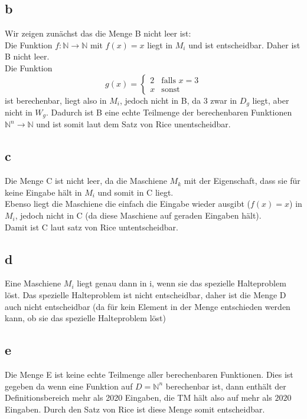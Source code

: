 \documentclass[14pt]{article}
\begin{document}
\subsection*{b}
Wir zeigen zunächst das die Menge B nicht leer ist: \\
Die Funktion $f: \mathbb{N} \rightarrow \mathbb{N}$ mit $f(x) = x$ liegt
in $M_i$ und ist entscheidbar. Daher ist B nicht leer. \\
Die Funktion 
\begin{equation*}
    g(x) =
    \begin{cases}
        2                 & \text{falls $x = 3$}             \\
        x                   & \text{sonst}
    \end{cases}
\end{equation*}
ist berechenbar, liegt also in $M_i$, jedoch nicht in B, da $3$ zwar 
in $D_g$ liegt, aber nicht in $W_g$. Dadurch
ist B eine echte Teilmenge der berechenbaren Funktionen $\mathbb{N}^n
\rightarrow \mathbb{N}$ und ist somit laut dem Satz von Rice
unentscheidbar.
\subsection*{c}
Die Menge C ist nicht leer, da die Maschiene $M_k$ mit der Eigenschaft,
dass sie für keine Eingabe hält in $M_i$ und somit in C liegt. \\
Ebenso liegt die Maschiene die einfach die Eingabe wieder ausgibt
($f(x) = x$) in $M_i$, jedoch nicht in C (da diese Maschiene auf
geraden Eingaben hält). \\
Damit ist C laut satz von Rice untentscheidbar.
\subsection*{d}
Eine Maschiene $M_i$ liegt genau dann in i, wenn sie das spezielle
Halteproblem löst. Das spezielle Halteproblem ist nicht entscheidbar,
daher ist die Menge D auch nicht entscheidbar (da für kein Element
in der Menge entschieden werden kann, ob sie das spezielle Halteproblem
löst)
\subsection*{e}
Die Menge E ist keine echte Teilmenge aller berechenbaren Funktionen.
Dies ist gegeben da wenn eine Funktion auf $D = \mathbb{N}^n$ berechenbar 
ist, dann enthält der Definitionsbereich mehr als 2020 Eingaben, die
TM hält also auf mehr als $2020$ Eingaben. Durch den Satz von Rice
ist diese Menge somit entscheidbar.
\end{document}
